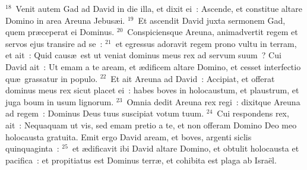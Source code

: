${}^{18}$~Venit autem Gad ad David in die illa, et dixit ei~: Ascende, et constitue altare Domino in area Areuna Jebus\ae i.
${}^{19}$~Et ascendit David juxta sermonem Gad, quem pr\ae ceperat ei Dominus.
${}^{20}$~Conspiciensque Areuna, animadvertit regem et servos ejus transire ad se~:
${}^{21}$~et egressus adoravit regem prono vultu in terram, et ait~: Quid caus\ae\ est ut veniat dominus meus rex ad servum suum~? Cui David ait~: Ut emam a te aream, et \ae dificem altare Domino, et cesset interfectio qu\ae\ grassatur in populo.
${}^{22}$~Et ait Areuna ad David~: Accipiat, et offerat dominus meus rex sicut placet ei~: habes boves in holocaustum, et plaustrum, et juga boum in usum lignorum.
${}^{23}$~Omnia dedit Areuna rex regi~: dixitque Areuna ad regem~: Dominus Deus tuus suscipiat votum tuum.
${}^{24}$~Cui respondens rex, ait~: Nequaquam ut vis, sed emam pretio a te, et non offeram Domino Deo meo holocausta gratuita. Emit ergo David aream, et boves, argenti siclis quinquaginta~:
${}^{25}$~et \ae dificavit ibi David altare Domino, et obtulit holocausta et pacifica~: et propitiatus est Dominus terr\ae , et cohibita est plaga ab Isra\"el.
